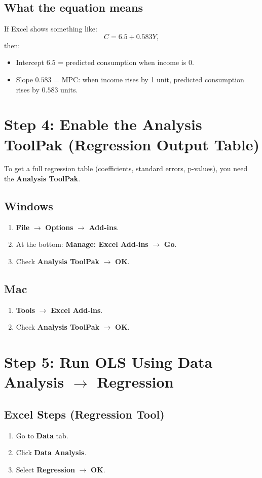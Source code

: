 \documentclass[11pt]{article}
\begin{document}
\subsection*{What the equation means}
If Excel shows something like:
\[
C = 6.5 + 0.583Y,
\]
then:
\begin{itemize}
  \item Intercept $6.5$ = predicted consumption when income is $0$.
  \item Slope $0.583$ = MPC: when income rises by 1 unit, predicted consumption rises by $0.583$ units.
\end{itemize}

\section*{Step 4: Enable the Analysis ToolPak (Regression Output Table)}
To get a full regression table (coefficients, standard errors, p-values), you need the \textbf{Analysis ToolPak}.

\subsection*{Windows}
\begin{enumerate}
  \item \textbf{File} $\rightarrow$ \textbf{Options} $\rightarrow$ \textbf{Add-ins}.
  \item At the bottom: \textbf{Manage: Excel Add-ins} $\rightarrow$ \textbf{Go}.
  \item Check \textbf{Analysis ToolPak} $\rightarrow$ \textbf{OK}.
\end{enumerate}

\subsection*{Mac}
\begin{enumerate}
  \item \textbf{Tools} $\rightarrow$ \textbf{Excel Add-ins}.
  \item Check \textbf{Analysis ToolPak} $\rightarrow$ \textbf{OK}.
\end{enumerate}

\section*{Step 5: Run OLS Using Data Analysis $\rightarrow$ Regression}
\subsection*{Excel Steps (Regression Tool)}
\begin{enumerate}
  \item Go to \textbf{Data} tab.
  \item Click \textbf{Data Analysis}.
  \item Select \textbf{Regression} $\rightarrow$ \textbf{OK}.
\end{enumerate}
\end{document}
